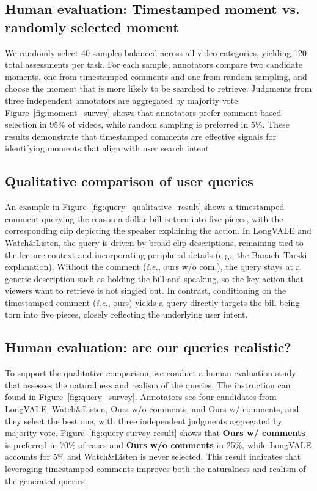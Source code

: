 \documentclass[11pt]{article}
\newcommand{\ie}{\emph{i.e.}}
\newcommand{\figref}[1]{Figure~\ref{#1}}
\begin{document}
\subsection{Human evaluation: Timestamped moment vs. randomly selected moment}
We randomly select 40 samples balanced across all video categories, yielding 120 total assessments per task.
For each sample, annotators compare two candidate moments, one from timestamped comments and one from random sampling, and choose the moment that is more likely to be searched to retrieve.
Judgments from three independent annotators are aggregated by majority vote.
Figure~\ref{fig:moment_survey} shows that annotators prefer comment-based selection in 95\% of videos, while random sampling is preferred in 5\%.
These results demonstrate that timestamped comments are effective signals for identifying moments that align with user search intent.




\subsection{Qualitative comparison of user queries}
An example in Figure~\ref{fig:query_qualitative_result} shows a timestamped comment querying the reason a dollar bill is torn into five pieces, with the corresponding clip depicting the speaker explaining the action.
In LongVALE and Watch\&Listen, the query is driven by broad clip descriptions, remaining tied to the lecture context and incorporating peripheral details (e.g., the Banach–Tarski explanation).
Without the comment (\ie, ours w/o com.), the query stays at a generic description such as holding the bill and speaking, so the key action that viewers want to retrieve is not singled out.
In contrast, conditioning on the timestamped comment (\ie, ours) yields a query directly targets the bill being torn into five pieces, closely reflecting the underlying user intent.

\subsection{Human evaluation: are our queries realistic?}
To support the qualitative comparison, we conduct a human evaluation study that assesses the naturalness and realism of the queries.
The instruction can found in \figref{fig:query_survey}. 
Annotators see four candidates from LongVALE, Watch\&Listen, Ours w/o comments, and Ours w/ comments, and they select the best one, with three independent judgments aggregated by majority vote.
Figure~\ref{fig:query survey result} shows that \textbf{Ours w/ comments} is preferred in 70\% of cases and \textbf{Ours w/o comments} in 25\%, while LongVALE accounts for 5\% and Watch\&Listen is never selected. 
This result indicates that leveraging timestamped comments improves both the naturalness and realism of the generated queries.
\end{document}
